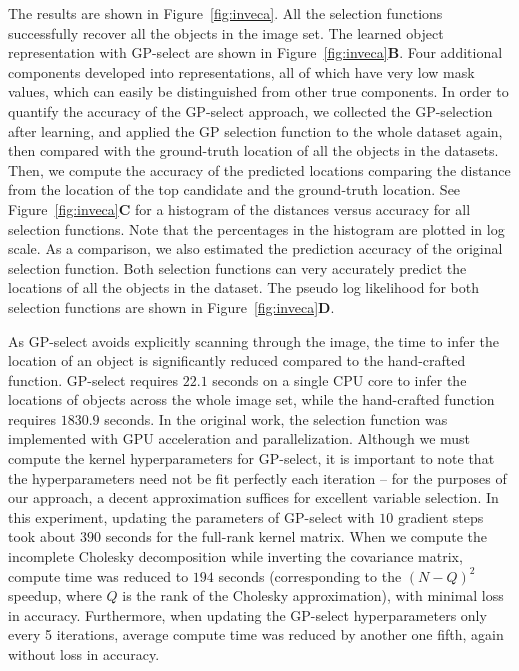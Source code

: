 The results are shown in Figure~\ref{fig:inveca}. All the selection functions successfully recover all the objects in the image set. The learned object representation with GP-select are shown in Figure~\ref{fig:inveca}\textbf{B}.
Four additional components developed into representations, all of which have very low mask values,  which can easily be distinguished from other true components.
In order to quantify the accuracy of the GP-select approach, we collected the GP-selection after learning, and applied the GP selection function to the whole dataset again, then compared with the ground-truth location of all the objects in the datasets.
%
Then, we compute the accuracy of the predicted locations comparing the distance from the location of the top candidate and the ground-truth location. See Figure~\ref{fig:inveca}\textbf{C} for a histogram of the distances versus accuracy for all selection functions. Note that the percentages in the histogram are plotted in log scale.
As a comparison, we also estimated the prediction accuracy of the original selection function. Both selection functions can very accurately predict the locations of all the objects in the dataset.
The pseudo log likelihood \cite{DaiEtAl2013} for both selection functions are shown in Figure~\ref{fig:inveca}\textbf{D}.


As GP-select avoids explicitly scanning through the image, the time to infer the location of an object is significantly reduced compared to the hand-crafted function. GP-select requires $22.1$ seconds on a single CPU core to infer the locations of objects across the whole image set, while the hand-crafted function requires $1830.9$ seconds. In the original work, the selection function was implemented with GPU acceleration and parallelization. 
Although we must compute the kernel hyperparameters for GP-select, 
it is important to note that the hyperparameters need not be fit perfectly each iteration -- for the purposes of our approach, a decent approximation suffices for excellent variable selection. 
 In this experiment, updating the parameters of GP-select with $10$ gradient steps took about $390$ seconds for the full-rank kernel matrix. 
When we compute the incomplete Cholesky decomposition while inverting the covariance matrix, compute time was reduced to $194$ seconds (corresponding to the $(N-Q)^2$ speedup, where $Q$ is the rank of the Cholesky approximation), with minimal loss in accuracy.
Furthermore, when updating the GP-select hyperparameters only every 5 iterations, average compute time was reduced by another one fifth, again without loss in accuracy.


